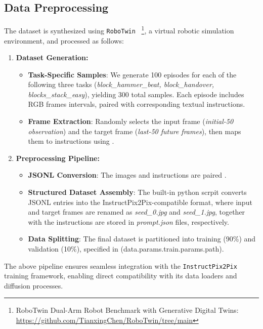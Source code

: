 \subsection{Data Preprocessing}
\label{sec:data-preprocessing}

The dataset is synthesized using \texttt{RoboTwin}~\cite{mu2025robotwindualarmrobotbenchmark}
\footnote{RoboTwin Dual-Arm Robot Benchmark with Generative Digital Twins: \url{https://github.com/TianxingChen/RoboTwin/tree/main}}, 
    a virtual robotic simulation environment, and processed as follows:
\begin{enumerate}
    \item \textbf{Dataset Generation:}
    \begin{itemize}
        \item \textbf{Task-Specific Samples}:
        We generate 100 episodes for each of the following three tasks 
            (\textit{block\_hammer\_beat, block\_handover, blocks\_stack\_easy}), yielding 300 total samples. 
        Each episode includes RGB frames intervals, paired with corresponding textual instructions.
        \item \textbf{Frame Extraction}:
        Randomly selects the input frame (\textit{initial-50 observation}) and the target frame (\textit{last-50 future frames}), 
            then maps them to instructions using .
    \end{itemize}
    \item \textbf{Preprocessing Pipeline:}
    \begin{itemize}
        \item \textbf{JSONL Conversion}:
        The images and instructions are paired .
        \item \textbf{Structured Dataset Assembly}:
        The built-in python scrpit  converts JSONL entries into the InstructPix2Pix-compatible format,
            where input and target frames are renamed as \textit{{seed}\_0.jpg} and \textit{{seed}\_1.jpg}, 
            together with the instructions are stored in \textit{prompt.json} files, respectively.
        \item \textbf{Data Splitting}:
        The final dataset is partitioned into training (90\%) and validation (10\%), 
            specified in  (data.params.train.params.path).
    \end{itemize}
\end{enumerate}

The above pipeline ensures seamless integration with the \texttt{InstructPix2Pix} training framework, 
    enabling direct compatibility with its data loaders and diffusion processes.